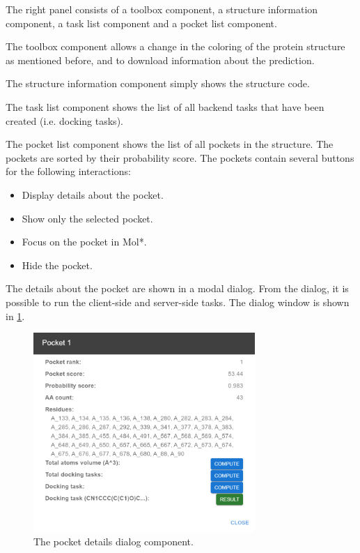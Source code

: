 The right panel consists of a toolbox component, a structure information component, a task list component and a pocket list component. 

The toolbox component allows a change in the coloring of the protein structure as mentioned before, and to download information about the prediction.

The structure information component simply shows the structure code.

The task list component shows the list of all backend tasks that have been created (i.e. docking tasks).

The pocket list component shows the list of all pockets in the structure. The pockets are sorted by their probability score. The pockets contain several buttons for the following interactions:

\begin{itemize}
    \item Display details about the pocket.
    \item Show only the selected pocket.
    \item Focus on the pocket in Mol*.
    \item Hide the pocket.
\end{itemize}

The details about the pocket are shown in a modal dialog. From the dialog, it is possible to run the client-side and server-side tasks. The dialog window is shown in \cref{fig:pocket_details}.

\begin{figure}[ht]
    \centering
    \includegraphics[width=0.75\textwidth]{img/pw_pocketdetails.png}
    \caption{The pocket details dialog component.}
    \label{fig:pocket_details}
\end{figure}

